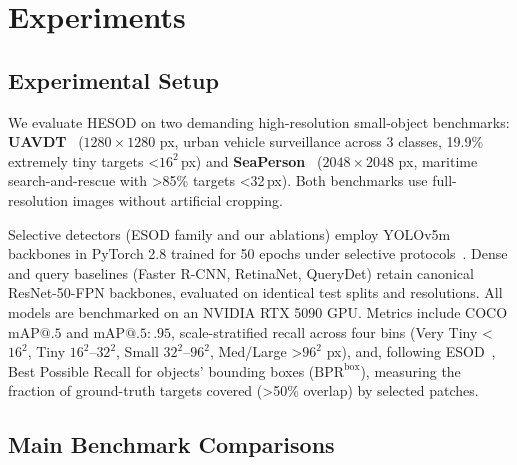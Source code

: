 \section{Experiments}

\subsection{Experimental Setup}

We evaluate HESOD on two demanding high-resolution small-object benchmarks: \textbf{UAVDT}~\cite{UAVDT} ($1280 \times 1280$ px, urban vehicle surveillance across 3 classes, 19.9\% extremely tiny targets \textless$16^2$\,px) and \textbf{SeaPerson}~\cite{SeaDronesSee, TinyPerson} ($2048 \times 2048$ px, maritime search-and-rescue with \textgreater85\% targets \textless32\,px). Both benchmarks use full-resolution images without artificial cropping.

Selective detectors (ESOD family and our ablations) employ YOLOv5m backbones in PyTorch 2.8 trained for 50 epochs under selective protocols~\cite{ESOD}. Dense and query baselines (Faster R-CNN, RetinaNet, QueryDet) retain canonical ResNet-50-FPN backbones, evaluated on identical test splits and resolutions. All models are benchmarked on an NVIDIA RTX 5090 GPU. Metrics include COCO $\mathrm{mAP@.5}$ and $\mathrm{mAP@.5:.95}$, scale-stratified recall across four bins (Very Tiny \textless$16^2$, Tiny $16^2\text{--}32^2$, Small $32^2\text{--}96^2$, Med/Large \textgreater$96^2$ px), and, following ESOD~\cite{ESOD}, Best Possible Recall for objects' bounding boxes ($\mathrm{BPR}^{\mathrm{box}}$), measuring the fraction of ground-truth targets covered (\textgreater50\% overlap) by selected patches.

\subsection{Main Benchmark Comparisons}

